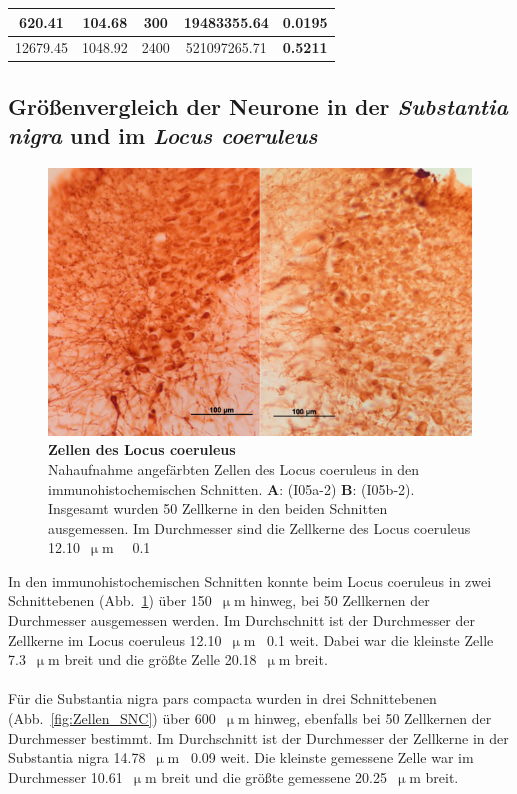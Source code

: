 \documentclass[12pt,a4paper,pdftex]{article}
\newcommand{\rpm}{\raisebox{.2ex}{$\scriptstyle\pm$} }
\begin{document}
\begin{table}[H]
\begin{tabular}{ccccc}
620.41                                  & 104.68                                   & 300                                    & 19483355.64                                & 0.0195                                     \\ \hline
12679.45                                & 1048.92                                  & 2400                                   & 521097265.71                               & \textbf{0.5211}                           
\end{tabular}
\end{table}

\newpage
\subsection{Größenvergleich der Neurone in der \textit{Substantia nigra} und im \textit{Locus coeruleus}}

\begin{figure}[H]
    \centering
    \includegraphics{pictures/immu/Zellen_LC.png}
    \caption[Zellen des Locus coeruleus]{\textbf{Zellen des Locus coeruleus}\\
    Nahaufnahme angefärbten Zellen des Locus coeruleus in den immunohistochemischen Schnitten. \textbf{A}: (I05a-2) \textbf{B}: (I05b-2). Insgesamt wurden 50 Zellkerne in den beiden Schnitten ausgemessen. Im Durchmesser sind die Zellkerne des Locus coeruleus 12.10~$\upmu$m~\rpm~0.1}
    \label{fig:Zellen_LC}
\end{figure}

In den immunohistochemischen Schnitten konnte beim Locus coeruleus in zwei Schnittebenen (Abb.~\ref{fig:Zellen_LC}) über 150~$\upmu$m hinweg, bei 50 Zellkernen der Durchmesser ausgemessen werden. Im Durchschnitt ist der Durchmesser der Zellkerne im Locus coeruleus 12.10~$\upmu$m~\rpm0.1 weit. Dabei war die kleinste Zelle 7.3~$\upmu$m breit und die größte Zelle 20.18~$\upmu$m breit.
\\
\\
Für die Substantia nigra pars compacta wurden in drei Schnittebenen (Abb.~\ref{fig:Zellen_SNC}) über 600~$\upmu$m hinweg, ebenfalls bei 50 Zellkernen der Durchmesser bestimmt. Im Durchschnitt ist der Durchmesser der Zellkerne in der Substantia nigra 14.78~$\upmu$m~\rpm0.09 weit. Die kleinste gemessene Zelle war im Durchmesser 10.61~$\upmu$m breit und die größte gemessene 20.25~$\upmu$m breit.
\end{document}
